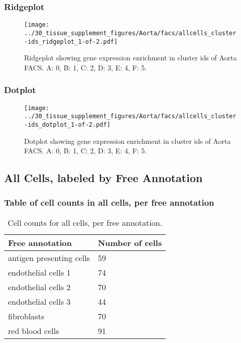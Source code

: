 \newpage
\newpage
\subsubsection{Ridgeplot}
\begin{figure}[h]
\centering
\texttt{[image: ../30\_tissue\_supplement\_figures/Aorta/facs/allcells\_cluster-ids\_ridgeplot\_1-of-2.pdf]}

\caption{ Ridgeplot  showing gene expression enrichment in cluster ids of Aorta FACS. A: 0, B: 1, C: 2, D: 3, E: 4, F: 5.}
\end{figure}


\newpage
\newpage
\subsubsection{Dotplot}
\begin{figure}[h]
\centering
\texttt{[image: ../30\_tissue\_supplement\_figures/Aorta/facs/allcells\_cluster-ids\_dotplot\_1-of-2.pdf]}

\caption{ Dotplot  showing gene expression enrichment in cluster ids of Aorta FACS. A: 0, B: 1, C: 2, D: 3, E: 4, F: 5.}
\end{figure}


\newpage
\subsection{All Cells, labeled by Free Annotation}
\subsubsection{Table of cell counts in all cells, per free annotation}\begin{table}[h]
\centering
\label{my-label}
\begin{tabular}{@{}ll@{}}
\toprule

Free annotation& Number of cells \\ \midrule
antigen presenting cells & 59 \\

endothelial cells 1 & 74 \\

endothelial cells 2 & 70 \\

endothelial cells 3 & 44 \\

fibroblasts & 70 \\

red blood cells & 91 \\
\bottomrule
\end{tabular}
\caption{Cell counts for all cells, per free annotation.}
\end{table}

